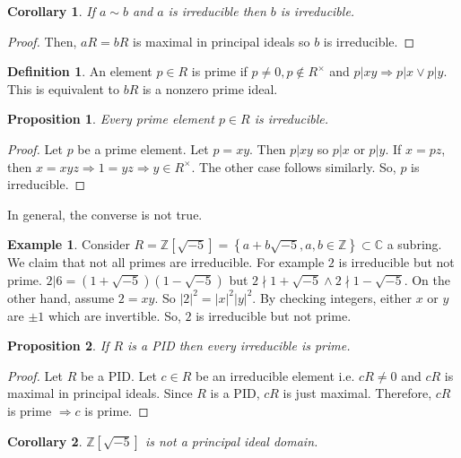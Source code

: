 \documentclass{article}
\newcommand\Z{\ensuremath{\mathbb{Z}}}
\newcommand\C{\ensuremath{\mathbb{C}}}
\newtheorem{corollary}{Corollary}[theorem]
\theoremstyle{definition}
\newtheorem{definition}{Definition}[subsection]
\newtheorem{eg}{Example}[subsection]
\theoremstyle{remark}
\theoremstyle{plain}
\newtheorem{prop}{Proposition}[subsection]
\begin{document}
\begin{corollary}
    If \(a\sim b\) and \(a\) is irreducible then \(b\) is irreducible.
\end{corollary}
\begin{proof}
    Then, \(aR = bR\) is maximal in principal ideals so \(b\) is irreducible.
\end{proof}

\begin{definition}
    An element \(p \in R\) is prime if \(p \neq 0, p \notin R^{\times}\) and \(p|xy \Rightarrow p|x \lor p|y\). 
    This is equivalent to \(bR\) is a nonzero prime ideal.
\end{definition}

\begin{prop}
    Every prime element \(p \in R\) is irreducible. 
\end{prop}
\begin{proof}
    Let \(p\) be a prime element. Let \(p = xy\). Then \(p|xy\) so \(p|x\) or \(p|y\).
    If \( x = pz\), then \(x = xyz \Rightarrow 1 = yz \Rightarrow y \in R^{\times}\). 
    The other case follows similarly. So, \(p\) is irreducible.
\end{proof}

In general, the converse is not true. 

\begin{eg}
    Consider \(R = \Z[\sqrt{-5}]  = \left\{ a + b\sqrt{-5}, a, b \in \Z \right\}\subset \C\) a subring.
    We claim that not all primes are irreducible. For example \(2\) is irreducible but not prime. \(2|6 = (1+\sqrt{-5})(1-\sqrt{-5})\) but \(2\nmid 1+\sqrt{-5} \land 2\nmid 1 - \sqrt{-5}\).
    On the other hand, assume \(2 = xy\). So \(|2|^2 = |x|^2|y|^2\). By checking integers, either \(x\) or \(y\) are \(\pm 1\) which are invertible. So, \(2\) is irreducible but not prime.
\end{eg}

\begin{prop}
    If \(R\) is a PID then every irreducible is prime. 
\end{prop}
\begin{proof}
    Let \(R\) be a PID. Let \(c \in R\) be an irreducible element i.e. \(cR \neq 0\) and \(cR\) is maximal in principal ideals. 
    Since \(R\) is a PID, \(cR\) is just maximal. Therefore, \(cR\) is prime \(\Rightarrow c\) is prime. 
\end{proof}

\begin{corollary}
    \(\Z[\sqrt{-5}]\) is not a principal ideal domain. 
\end{corollary}
\end{document}
